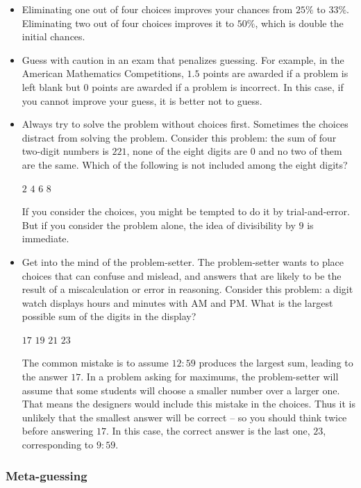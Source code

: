 \documentclass[10pt,paper=letter]{scrartcl}
\begin{document}
\begin{itemize}

\item Eliminating one out of four choices improves your chances from $25\%$ to $33\%$. Eliminating two out of four choices improves it to $50\%$, which is double the initial chances.

\item Guess with caution in an exam that penalizes guessing. For example, in the American Mathematics Competitions, $1.5$ points are awarded if a problem is left blank but $0$ points are awarded if a problem is incorrect. In this case, if you cannot improve your guess, it is better not to guess.

\item Always try to solve the problem without choices first. Sometimes the choices distract from solving the problem. Consider this problem: the sum of four two-digit numbers is $221$, none of the eight digits are $0$ and no two of them are the same. Which of the following is not included among the eight digits?

\fourch
{$2$}
{$4$}
{$6$}
{$8$}

If you consider the choices, you might be tempted to do it by trial-and-error. But if you consider the problem alone, the idea of divisibility by $9$ is immediate.

\item Get into the mind of the problem-setter. The problem-setter wants to place choices that can confuse and mislead, and answers that are likely to be the result of a miscalculation or error in reasoning. Consider this problem: a digit watch displays hours and minutes with AM and PM. What is the largest possible sum of the digits in the display?

\fourch
{$17$}
{$19$}
{$21$}
{$23$}

The common mistake is to assume $12:59$ produces the largest sum, leading to the answer $17$. In a problem asking for maximums, the problem-setter will assume that some students will choose a smaller number over a larger one. That means the designers would include this mistake in the choices. Thus it is unlikely that the smallest answer will be correct -- so you should think twice before answering $17$. In this case, the correct answer is the last one, $23$, corresponding to $9:59$.

\end{itemize}

\subsubsection*{Meta-guessing}
\end{document}
